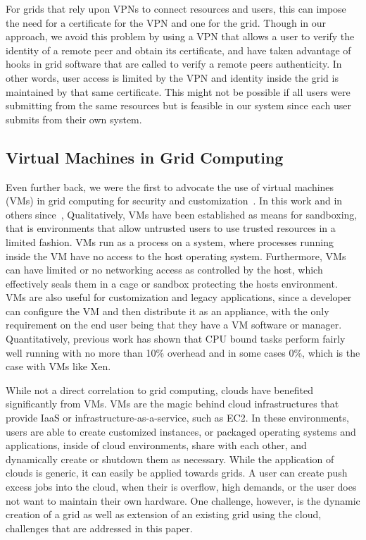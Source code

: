 \documentclass[conference]{IEEEtran}
\begin{document}
For grids that rely upon VPNs to connect resources and users, this can impose
the need for a certificate for the VPN and one for the grid.  Though in our
approach, we avoid this problem by using a VPN that allows a user to verify the
identity of a remote peer and obtain its certificate, and have taken advantage
of hooks in grid software that are called to verify a remote peers
authenticity.  In other words, user access is limited by the VPN and identity
inside the grid is maintained by that same certificate.  This might not be
possible if all users were submitting from the same resources but is feasible
in our system since each user submits from their own system.

\subsection{Virtual Machines in Grid Computing}

Even further back, we were the first to advocate the use of virtual machines
(VMs) in grid computing for security and
customization~\cite{case_for_grid_computing_on_vms}.  In this work and in
others since~\cite{sandbox, swan, sandbox1}, Qualitatively, VMs have been
established as means for sandboxing, that is environments that allow untrusted
users to use trusted resources in a limited fashion.  VMs run as a process on a
system, where processes running inside the VM have no access to the host
operating system.  Furthermore, VMs can have limited or no networking access as
controlled by the host, which effectively seals them in a cage or sandbox
protecting the hosts environment.  VMs are also useful for customization and
legacy applications, since a developer can configure the VM and then distribute
it as an appliance, with the only requirement on the end user being that they
have a VM software or manager.  Quantitatively, previous work has shown that
CPU bound tasks perform fairly well running with no more than 10\% overhead and
in some cases 0\%, which is the case with VMs like Xen.

While not a direct correlation to grid computing, clouds have benefited
significantly from VMs.  VMs are the magic behind cloud infrastructures that
provide IaaS or infrastructure-as-a-service, such as EC2.  In these
environments, users are able to create customized instances, or packaged
operating systems and applications, inside of cloud environments, share with
each other, and dynamically create or shutdown them as necessary.  While the
application of clouds is generic, it can easily be applied towards grids.  A
user can create push excess jobs into the cloud, when their is overflow, high
demands, or the user does not want to maintain their own hardware.  One
challenge, however, is the dynamic creation of a grid as well as extension of
an existing grid using the cloud, challenges that are addressed in this paper.
\end{document}
